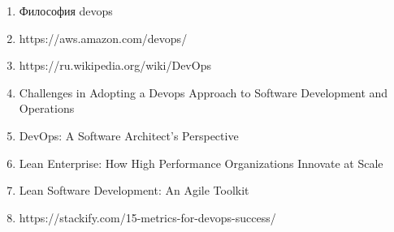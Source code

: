 

\begin{enumerate}[{label=\arabic{*}}]

\item Философия devops
    \label{book:Effective Devops}

\item https://aws.amazon.com/devops/
    \label{site:aws.amazon.com/devops}

\item https://ru.wikipedia.org/wiki/DevOps
    \label{site:ru.wikipedia.org/wiki/devops}

\item Challenges in Adopting a Devops Approach to Software Development and Operations
    \label{article:Challenges in Adopting a Devops}

\item DevOps: A Software Architect's Perspective
    \label{book:DevOps: A Software Architect's Perspective}

\item Lean Enterprise: How High Performance Organizations Innovate at Scale
    \label{book:Lean Enterprise}
 
\item Lean Software Development: An Agile Toolkit
    \label{book:Lean Software Development}

\item https://stackify.com/15-metrics-for-devops-success/
    \label{site:stackify.com/15-metrics}

\end{enumerate}

